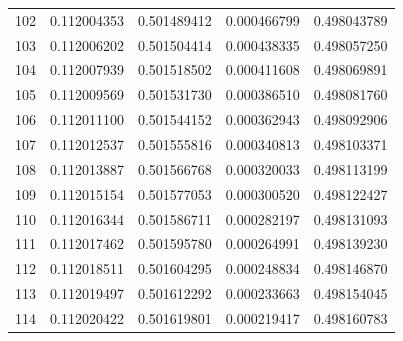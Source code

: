 \begin{tabular}{rcccc}
102 & 0.112004353 & 0.501489412 & 0.000466799 & 0.498043789 \\
103 & 0.112006202 & 0.501504414 & 0.000438335 & 0.498057250 \\
104 & 0.112007939 & 0.501518502 & 0.000411608 & 0.498069891 \\
105 & 0.112009569 & 0.501531730 & 0.000386510 & 0.498081760 \\
106 & 0.112011100 & 0.501544152 & 0.000362943 & 0.498092906 \\
107 & 0.112012537 & 0.501555816 & 0.000340813 & 0.498103371 \\
108 & 0.112013887 & 0.501566768 & 0.000320033 & 0.498113199 \\
109 & 0.112015154 & 0.501577053 & 0.000300520 & 0.498122427 \\
110 & 0.112016344 & 0.501586711 & 0.000282197 & 0.498131093 \\
111 & 0.112017462 & 0.501595780 & 0.000264991 & 0.498139230 \\
112 & 0.112018511 & 0.501604295 & 0.000248834 & 0.498146870 \\
113 & 0.112019497 & 0.501612292 & 0.000233663 & 0.498154045 \\
114 & 0.112020422 & 0.501619801 & 0.000219417 & 0.498160783 \\
\bottomrule
\end{tabular}
